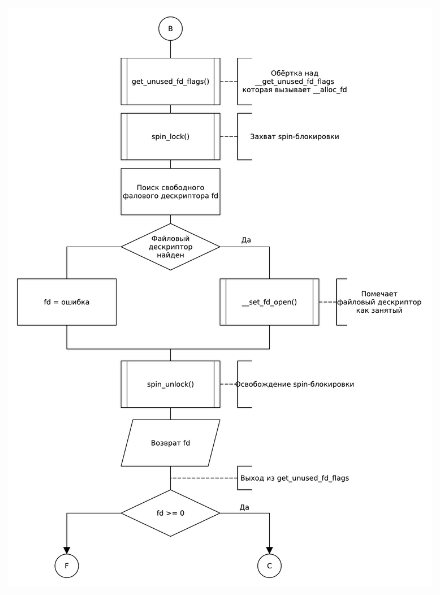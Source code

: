 \begin{figure}[H]
    \centering
    \caption{}
    \includegraphics[scale=0.5]{pdf/flowchart03.pdf}
\end{figure}
